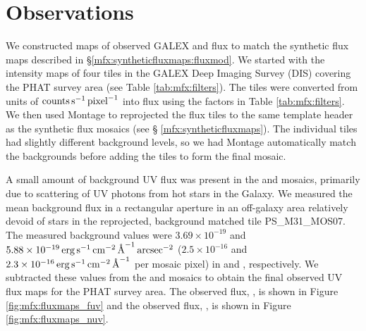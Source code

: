 \section{Observations}\label{mfx:observations}

We constructed maps of observed GALEX \fuv{} and \nuv{} flux to match the
synthetic flux maps described in \S \ref{mfx:syntheticfluxmaps:fluxmod}. We
started with the intensity maps of four tiles in the GALEX Deep Imaging Survey
(DIS) covering the PHAT survey area (see Table \ref{tab:mfx:filters}). The
tiles were converted from units of $\mathrm{counts} \,\mathrm{s}^{-1}
\,\mathrm{pixel}^{-1}$ into flux using the factors in Table
\ref{tab:mfx:filters}. We then used Montage to reprojected the flux tiles to
the same template header as the synthetic flux mosaics (see \S
\ref{mfx:syntheticfluxmaps}). The individual tiles had slightly different
background levels, so we had Montage automatically match the backgrounds before
adding the tiles to form the final mosaic.

A small amount of background UV flux was present in the \fuv{} and \nuv{}
mosaics, primarily due to scattering of UV photons from hot stars in the
Galaxy. We measured the mean background flux in a rectangular aperture in an
off-galaxy area relatively devoid of stars in the reprojected, background
matched tile PS\_M31\_MOS07. The measured background values were $3.69 \times
10^{-19}$ and $5.88 \times
10^{-19}\,\mathrm{erg}\,\mathrm{s}^{-1}\,\mathrm{cm}^{-2}\,\textrm{\AA}^{-1}\,\mathrm{arcsec}^{-2}$ ($2.5 \times 10^{-16}$
and $2.3 \times 10^{-16}\,\mathrm{erg}\,\mathrm{s}^{-1}\,\mathrm{cm}^{-2}\,\textrm{\AA}^{-1}$ per mosaic pixel) in
\fuv{} and \nuv{}, respectively. We subtracted these values from the \fuv{} and
\nuv{} mosaics to obtain the final observed UV flux maps for the PHAT survey
area. The observed \fuv{} flux, \ffuvobs{}, is shown in Figure
\ref{fig:mfx:fluxmaps_fuv} and the observed \nuv{} flux, \fnuvobs{}, is shown
in Figure \ref{fig:mfx:fluxmaps_nuv}.


